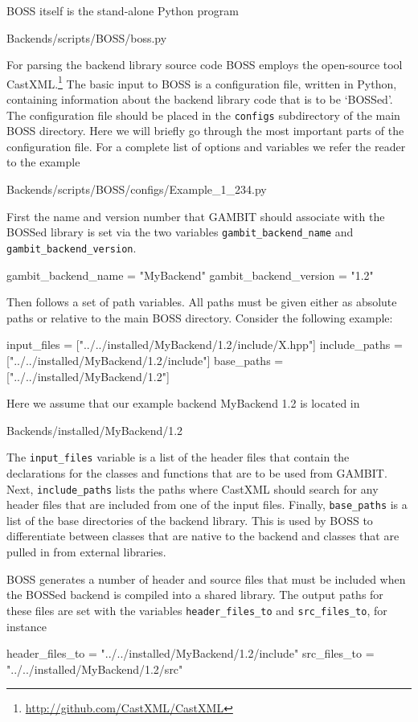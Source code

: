 \documentclass[pdftex,twocolumn,epjc3_preprint,runningheads]{svjour3}
\renewcommand{\_}{\discretionary{\underscore}{}{\underscore}}
\newcommand\yaml[1]{{\lstset{style=yaml}\lstinline!#1!\lstset{style=cpp}}}
\newcommand\term[1]{{\lstset{style=terminal}\lstinline!#1!\lstset{style=cpp}}}
\newcommand\py[1]{{\lstset{style=python}\lstinline!#1!\lstset{style=cpp}}}
\newcommand{\gambit}{\textsf{GAMBIT}\xspace}
\newcommand{\BOSS}{\textsf{BOSS}\xspace}
\newcommand{\GB}{\gambit}
\newcommand\Python{\textsf{Python}\xspace}
\newcommand\python{\Python}
\renewcommand{\url}[1]{\href{#1}{#1}}
\begin{document}
\BOSS itself is the stand-alone \python program
\begin{lstterm}
Backends/scripts/BOSS/boss.py
\end{lstterm}
For parsing the backend library source code \BOSS employs the open-source tool \textsf{CastXML}.\footnote{\url{http://github.com/CastXML/CastXML}} The basic input to \BOSS is a configuration file, written in \python, containing information about the backend library code that is to be `BOSSed'. The configuration file should be placed in the \term{configs} subdirectory of the main \BOSS directory. Here we will briefly go through the most important parts of the configuration file. For a complete list of options and variables we refer the reader to the example
\begin{lstterm}
Backends/scripts/BOSS/configs/Example_1_234.py
\end{lstterm}

First the name and version number that \GB should associate with the BOSSed library is set via the two variables \yaml{gambit_backend_name} and \yaml{gambit_backend_version}.
\begin{lstpy}
gambit_backend_name    = "MyBackend"
gambit_backend_version = "1.2"
\end{lstpy}
Then follows a set of path variables. All paths must be given either as absolute paths or relative to the main \BOSS directory. Consider the following example:
\begin{lstpy}
input_files =
    ["../../installed/MyBackend/1.2/include/X.hpp"]
include_paths =
    ["../../installed/MyBackend/1.2/include"]
base_paths = ["../../installed/MyBackend/1.2"]
\end{lstpy}
Here we assume that our example backend \textsf{MyBackend 1.2} is located in
\begin{lstterm}
Backends/installed/MyBackend/1.2
\end{lstterm}
The \py{input_files} variable is a list of the header files that contain the declarations for the classes and functions that are to be used from \GB. Next, \py{include_paths} lists the paths where \textsf{CastXML} should search for any header files that are included from one of the input files. Finally, \py{base_paths} is a list of the base directories of the backend library. This is used by \BOSS to differentiate between classes that are native to the backend and classes that are pulled in from external libraries.

\BOSS generates a number of header and source files that must be included when the BOSSed backend is compiled into a shared library. The output paths for these files are set with the variables \py{header_files_to} and \py{src_files_to}, for instance
\begin{lstpy}
header_files_to =
    "../../installed/MyBackend/1.2/include"
src_files_to = "../../installed/MyBackend/1.2/src"
\end{lstpy}
\end{document}
